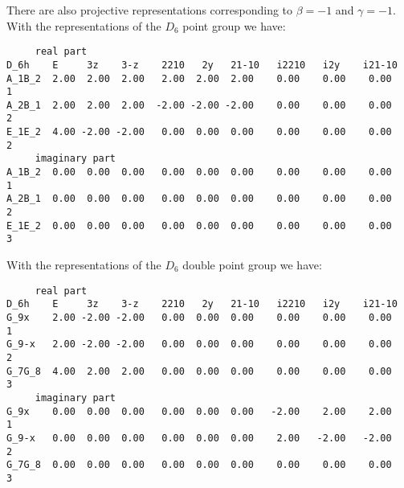 \documentclass[12pt,a4paper]{article}
\begin{document}
There are also projective representations corresponding to $\beta=-1$ 
and $\gamma=-1$. With the representations of the $D_6$ point group we have:  
\begin{footnotesize}
\begin{verbatim}
     real part
D_6h    E     3z    3-z    2210   2y   21-10   i2210   i2y    i21-10
A_1B_2  2.00  2.00  2.00   2.00  2.00  2.00    0.00    0.00    0.00     1
A_2B_1  2.00  2.00  2.00  -2.00 -2.00 -2.00    0.00    0.00    0.00     2
E_1E_2  4.00 -2.00 -2.00   0.00  0.00  0.00    0.00    0.00    0.00     2
     imaginary part
A_1B_2  0.00  0.00  0.00   0.00  0.00  0.00    0.00    0.00    0.00     1
A_2B_1  0.00  0.00  0.00   0.00  0.00  0.00    0.00    0.00    0.00     2
E_1E_2  0.00  0.00  0.00   0.00  0.00  0.00    0.00    0.00    0.00     3
\end{verbatim}
\end{footnotesize}
With the representations of the $D_6$ double point group we have:
\begin{footnotesize}
\begin{verbatim}
     real part
D_6h    E     3z    3-z    2210   2y   21-10   i2210   i2y    i21-10
G_9x    2.00 -2.00 -2.00   0.00  0.00  0.00    0.00    0.00    0.00     1
G_9-x   2.00 -2.00 -2.00   0.00  0.00  0.00    0.00    0.00    0.00     2
G_7G_8  4.00  2.00  2.00   0.00  0.00  0.00    0.00    0.00    0.00     3
     imaginary part
G_9x    0.00  0.00  0.00   0.00  0.00  0.00   -2.00    2.00    2.00     1
G_9-x   0.00  0.00  0.00   0.00  0.00  0.00    2.00   -2.00   -2.00     2
G_7G_8  0.00  0.00  0.00   0.00  0.00  0.00    0.00    0.00    0.00     3
\end{verbatim}
\end{footnotesize}

\newpage
\end{document}
